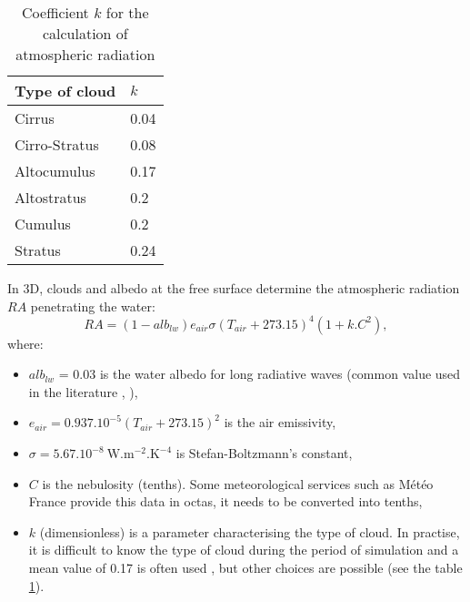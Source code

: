 \begin{table}[H]
\caption{Coefficient $k$ for the calculation of atmospheric radiation}
\label{tab_cloud_type}
\centering
\begin{tabular}{p{0.98in}p{0.39in}}
\hline
\multicolumn{1}{|p{0.98in}}{Type of cloud} & 
\multicolumn{1}{|p{0.39in}|}{$k$} \\
\hline
\multicolumn{1}{|p{0.98in}}{Cirrus} & 
\multicolumn{1}{|p{0.39in}|}{0.04} \\
\hline
\multicolumn{1}{|p{0.98in}}{Cirro-Stratus} & 
\multicolumn{1}{|p{0.39in}|}{0.08} \\
\hline
\multicolumn{1}{|p{0.98in}}{Altocumulus} & 
\multicolumn{1}{|p{0.39in}|}{0.17} \\
\hline
\multicolumn{1}{|p{0.98in}}{Altostratus} & 
\multicolumn{1}{|p{0.39in}|}{0.2} \\
\hline
\multicolumn{1}{|p{0.98in}}{Cumulus} & 
\multicolumn{1}{|p{0.39in}|}{0.2} \\
\hline
\multicolumn{1}{|p{0.98in}}{Stratus} & 
\multicolumn{1}{|p{0.39in}|}{0.24} \\
\hline

\end{tabular}
\end{table}

In 3D, clouds and albedo at
the free surface determine the atmospheric radiation $RA$ penetrating the water:
\begin{equation}
RA = (1-alb_{lw}) e_{air}\sigma(T_{air}+273.15)^{4}(1+k . C^{2}),
\end{equation}
where:
\begin{itemize}
\item $alb_{lw}$ = 0.03 is the water albedo for long radiative waves
  (common value used in the literature \cite{imerito_dyresm_2007},
  \cite{henderson-sellers_energy_balance_1986}),
\item $e_{air} = 0.937.10^{-5}(T_{air}+273.15)^{2}$ is the air emissivity,
\item $\sigma= 5.67.10^{-8}~\mathrm{{W.m^{-2}.K^{-4}}}$ is Stefan-Boltzmann's constant,
\item $C$ is the nebulosity (tenths). Some meteorological services such as
M\'{e}t\'{e}o France provide this data in octas, it needs to be converted
into tenths,
\item $k$ (dimensionless) is a parameter characterising the type of
cloud. In practise, it is difficult to know the type of cloud during the
period of simulation and a mean value of 0.17 is often used \cite{tva_heat_1972},
\cite{imerito_dyresm_2007} but other choices are possible
(see the table \ref{tab_cloud_type}).
\end{itemize}

